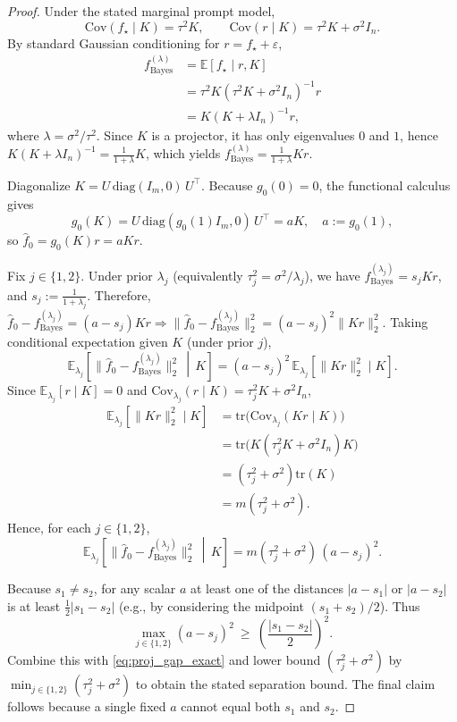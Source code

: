 \documentclass{article}
\theoremstyle{plain}
\theoremstyle{definition}
\theoremstyle{remark}
\begin{document}
\begin{proof}
Under the stated marginal prompt model,
\[
\mathrm{Cov}(f_\star\mid K)=\tau^2K,\qquad \mathrm{Cov}(r\mid K)=\tau^2K+\sigma^2I_n.
\]
By standard Gaussian conditioning for $r=f_\star+\varepsilon$,
\begin{align*}
    f_{\mathrm{Bayes}}^{(\lambda)}
    &=\mathbb E[f_\star\mid r,K] \\
    &=\tau^2K(\tau^2K+\sigma^2I_n)^{-1}r \\
    &=K(K+\lambda I_n)^{-1}r,
\end{align*}
where $\lambda=\sigma^2/\tau^2$. Since $K$ is a projector, it has only eigenvalues $0$ and $1$, hence $K(K+\lambda I_n)^{-1}=\frac{1}{1+\lambda}K$, which yields $f_{\mathrm{Bayes}}^{(\lambda)}=\frac{1}{1+\lambda}Kr$.

Diagonalize $K=U\,\mathrm{diag}(I_m,0)\,U^\top$. Because $g_0(0)=0$, the functional calculus gives
\[
g_0(K)=U\,\mathrm{diag}(g_0(1)I_m,0)\,U^\top = aK, \quad a:=g_0(1),
\]
so $\hat f_0=g_0(K)r=aKr$.


Fix $j\in\{1,2\}$. Under prior $\lambda_j$ (equivalently $\tau_j^2=\sigma^2/\lambda_j$), we have $f_{\mathrm{Bayes}}^{(\lambda_j)} = s_j Kr$, and $s_j:=\frac{1}{1+\lambda_j}$. Therefore,  $\hat f_0-f_{\mathrm{Bayes}}^{(\lambda_j)}=(a-s_j)Kr \Rightarrow \bigl\|\hat f_0-f_{\mathrm{Bayes}}^{(\lambda_j)}\bigr\|_2^2=(a-s_j)^2\|Kr\|_2^2$. Taking conditional expectation given $K$ (under prior $j$),
\[
     \mathbb E_{\lambda_j}\!\left[\bigl\|\hat f_0-f_{\mathrm{Bayes}}^{(\lambda_j)}\bigr\|_2^2 \,\middle|\, K\right]
=(a-s_j)^2\,\mathbb E_{\lambda_j}[\|Kr\|_2^2\mid K].
\]
Since $\mathbb E_{\lambda_j}[r\mid K]=0$ and $\mathrm{Cov}_{\lambda_j}(r\mid K)=\tau_j^2K+\sigma^2I_n$,
\begin{align*}
\mathbb E_{\lambda_j}[\|Kr\|_2^2\mid K]
&=\mathrm{tr}\!\bigl(\mathrm{Cov}_{\lambda_j}(Kr\mid K)\bigr) \\
&=\mathrm{tr}\!\bigl(K(\tau_j^2K+\sigma^2I_n)K\bigr) \\
&=(\tau_j^2+\sigma^2)\mathrm{tr}(K) \\
&=m(\tau_j^2+\sigma^2). 
\end{align*}
Hence, for each $j\in\{1,2\}$,
\begin{equation}
\label{eq:proj_gap_exact}
    \mathbb E_{\lambda_j}\!\left[\bigl\|\hat f_0-f_{\mathrm{Bayes}}^{(\lambda_j)}\bigr\|_2^2 \,\middle|\, K\right]
    = m(\tau_j^2+\sigma^2)\,(a-s_j)^2.
\end{equation}


Because $s_1\neq s_2$, for any scalar $a$ at least one of the distances $|a-s_1|$ or $|a-s_2|$ is at least
$\frac{1}{2}|s_1-s_2|$ (e.g., by considering the midpoint $(s_1+s_2)/2$). Thus
\[
\max_{j\in\{1,2\}}(a-s_j)^2 \ \ge\ \left(\frac{|s_1-s_2|}{2}\right)^2.
\]
Combine this with \eqref{eq:proj_gap_exact} and lower bound $(\tau_j^2+\sigma^2)$ by
$\min_{j\in\{1,2\}}(\tau_j^2+\sigma^2)$ to obtain the stated separation bound.
The final claim follows because a single fixed $a$ cannot equal both $s_1$ and $s_2$.
\end{proof}
\end{document}
